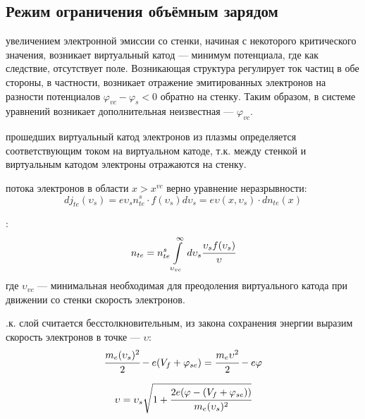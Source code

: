\subsection{Режим ограничения объёмным зарядом}

 увеличением электронной эмиссии со стенки, начиная с некоторого критического значения, 
возникает виртуальный катод --- минимум потенциала, где как следствие, отсутствует поле.
Возникающая структура регулирует ток частиц в обе стороны, в частности, возникает отражение
эмитированных электронов на разности потенциалов $\varphi_{vc} - \varphi_s < 0$ 
обратно на стенку. Таким образом, в системе уравнений возникает дополнительная 
неизвестная --- $\varphi_{vc}$.

 прошедших виртуальный катод электронов из плазмы определяется соответствующим током 
на виртуальном катоде, т.к. между стенкой и виртуальным катодом электроны отражаются на 
стенку.

 потока электронов в области $x > x^{vc}$ верно уравнение неразрывности:
\begin{equation}
	dj_{te}(\upsilon_s) = e\upsilon_s n_{te}^s \cdot f(\upsilon_s) d\upsilon_s = e\upsilon(x, \upsilon_s)\cdot dn_{te}(x)
\end{equation}

:
\begin{equation}
	n_{te} = n_{te}^s \int\limits_{\upsilon_{vc}}^{\infty}\,d\upsilon_s \cfrac{\upsilon_s f(\upsilon_s)}{\upsilon}
	\label{n_thermionic}
\end{equation}
где $\upsilon_{vc}$ --- минимальная необходимая для преодоления виртуального катода 
при движении со стенки скорость электронов.


.к. слой считается бесстолкновительным, из закона сохранения энергии выразим скорость  
электронов в точке --- $\upsilon$:
\begin{equation*}
	\cfrac{m_e(\upsilon_s)^2}{2} - e(V_f + \varphi_{se}) = \cfrac{m_e\upsilon^2}{2} - e\varphi
\end{equation*}

\begin{equation}
	\upsilon = \upsilon_s\sqrt{1 + \cfrac{2e(\varphi - (V_f + \varphi_{se}))}{m_e(\upsilon_s)^2}}
	\label{upsilon_th}
\end{equation}

